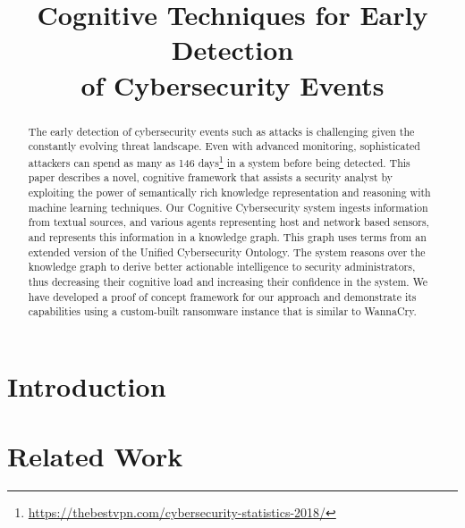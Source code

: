 \documentclass[10pt, conference, compsocconf]{IEEEtran}
\begin{document}
\title{Cognitive Techniques for Early Detection\\of Cybersecurity Events}

\author{
}

\maketitle

\begin{abstract}
The early detection of cybersecurity events such as attacks is challenging given the constantly evolving threat landscape. Even with advanced monitoring, sophisticated attackers can spend as many as 146 days\footnote{\url{https://thebestvpn.com/cybersecurity-statistics-2018/}} in a system before being detected. This paper describes a novel, cognitive framework that assists a security analyst by exploiting the power of semantically rich knowledge representation and reasoning with machine learning techniques. Our Cognitive Cybersecurity system ingests information from textual sources, and various agents representing host and network based sensors, and represents this information in a knowledge graph. This graph uses terms from an extended version of the Unified Cybersecurity Ontology. The system reasons over the knowledge graph to derive better actionable intelligence to security administrators, thus decreasing their cognitive load and increasing their confidence in the system. We have developed a proof of concept framework for our approach and demonstrate its capabilities using a custom-built ransomware instance that is similar to WannaCry. 

\end{abstract}

\IEEEpeerreviewmaketitle
\section{Introduction}


\section{Related Work}

\end{document}
